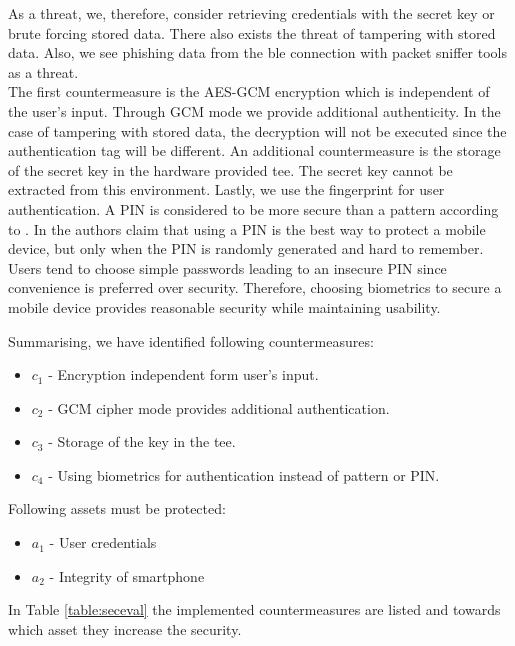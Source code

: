 As a threat, we, therefore, consider retrieving credentials with the secret key or brute forcing stored data. There also exists the threat of tampering with stored data. Also, we see phishing data from the \gls{ble} connection with packet sniffer tools as a threat. \\
%
The first countermeasure is the AES-GCM encryption which is independent of the user's input. Through GCM mode we provide additional authenticity. In the case of tampering with stored data, the decryption will not be executed since the authentication tag will be different. An additional countermeasure is the storage of the secret key in the hardware provided \gls{tee}. The secret key cannot be extracted from this environment. Lastly, we use the fingerprint for user authentication. A PIN is considered to be more secure than a pattern according to \cite{PinSaferThanPattern}. In \cite{SecureWayToLockPhone} the authors claim that using a PIN is the best way to protect a mobile device, but only when the PIN is randomly generated and hard to remember. Users tend to choose simple passwords leading to an insecure PIN since convenience is preferred over security. Therefore, choosing biometrics to secure a mobile device provides reasonable security while maintaining usability.

\noindent Summarising, we have identified following countermeasures:
\begin{itemize}
\item $c_1$ - Encryption independent form user's input.
\item $c_2$ - GCM cipher mode provides additional authentication.
\item $c_3$ - Storage of the key in the \gls{tee}.
\item $c_4$ - Using biometrics for authentication instead of pattern or PIN.
\end{itemize}
\vspace{0.5cm}

\noindent Following assets must be protected:
\begin{itemize}
\item $a_1$ - User credentials
\item $a_2$ - Integrity of smartphone
\end{itemize}
\vspace{0.5cm}

In Table \ref{table:seceval} the implemented countermeasures are listed and towards which asset they increase the security. \\


